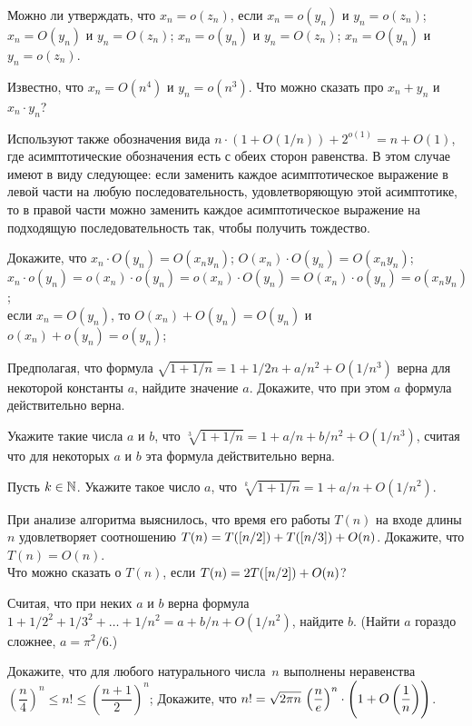 \documentclass[a4paper,12pt]{article}
\begin{document}
Можно ли утверждать, что $x_n = o(z_n)$, если
$x_n = o(y_n)$ и $y_n = o(z_n)$;
\\
$x_n = O(y_n)$ и $y_n = O(z_n)$;
$x_n = o(y_n)$ и $y_n = O(z_n)$;
$x_n = O(y_n)$ и $y_n = o(z_n)$.

Известно, что $x_n=O(n^4)$ и $y_n = o(n^3)$.
Что можно сказать про $x_n + y_n$ и $x_n \cdot y_n$?

\small
Используют также обозначения вида $n\cdot(1 + O(1/n)) + 2^{o(1)} = n + O(1)$, где асимптотические обозначения есть с обеих сторон равенства.
В этом случае имеют в виду следующее:
если заменить каждое асимптотическое выражение в левой части на любую последовательность, удовлетворяющую этой асимптотике,
то в правой части можно заменить каждое асимптотическое выражение на подходящую последовательность так, чтобы получить тождество.

Докажите, что
$x_n\cdot O(y_n) = O(x_n y_n)$;\quad
$O(x_n) \cdot O(y_n) = O(x_n y_n)$;
\\
$x_n\cdot o(y_n) = o(x_n) \cdot o(y_n) = o(x_n) \cdot O(y_n) = O(x_n) \cdot o(y_n) = o(x_n y_n)$;
\\
если $x_n=O(y_n)$, то $O(x_n) + O(y_n) = O(y_n)$ и $o(x_n) + o(y_n) = o(y_n)$;


Предполагая, что формула $\sqrt{1+1/n} = 1 + 1/2n + a/n^2 + O(1/n^3)$ верна для некоторой константы $a$, найдите значение $a$.
 Докажите, что при этом $a$ формула действительно верна.


Укажите такие числа $a$ и $b$, что $\sqrt[3]{1+1/n} = 1 + a/n + b/n^2 + O(1/n^3)$, считая что для некоторых $a$ и $b$ эта формула действительно верна.

Пусть $k\in\mathbb{N}$. Укажите такое число $a$, что $\sqrt[k]{1+1/n} = 1 + a/n + O(1/n^2)$.

При анализе алгоритма выяснилось, что время его работы $T(n)$ на входе длины $n$ удовлетворяет соотношению $T(n) = T(\left[n/2\right]) + T(\left[n/3\right]) + O(n)$. Докажите, что $T(n) = O(n)$.
\\
Что можно сказать о $T(n)$, если $T(n) = 2T(\left[n/2\right]) + O(n)$?

Считая, что при неких $a$ и $b$ верна формула
$1 + 1/2^2 + 1/3^2 + \ldots + 1/n^2 = a + b/n + O(1/n^2)$, найдите $b$.
(Найти $a$ гораздо сложнее, $a=\pi^2/6$.)


\vspace*{-2mm}
Докажите, что для любого натурального числа~$n$ выполнены неравенства $\left(\dfrac n4\right)^n\leqslant n!\leqslant\left(\dfrac{n+1}2\right)^n$;
\vspace*{-3mm}
Докажите, что $n! = \sqrt{2\pi n}\,\left(\dfrac{n}{e}\right)^n \cdot \Biggl(1 + O\left(\dfrac{1}{n}\right)\Biggr)$.
\vspace*{-4mm}


\end{document}
